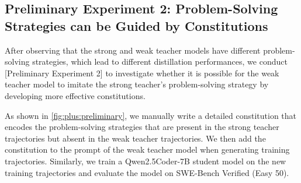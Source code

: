 \begin{table}[t]
\centering
\small
{}
\caption{Results on training Qwen2.5Coder-7B on successful trajectories of the exact same 399 function localization instances generated by Claude-3.7, Qwen2.5Coder-32B, and Qwen2.5Coder-32B with the constitutions we develop in the preliminary experiments (denoted as + \plusname-v0). 
We evaluate the student models on a subset of the SWE-bench Verified issue-solving dataset after training. 
}
\label{ablation:self-vs-claude}
\end{table}


\subsection{Preliminary Experiment 2: Problem-Solving Strategies can be Guided by Constitutions}
After observing that the strong and weak teacher models have different problem-solving strategies, which lead to different distillation performances, we conduct [Preliminary Experiment 2] to investigate whether it is possible for the weak teacher model to imitate the strong teacher's problem-solving strategy by developing more effective constitutions.

As shown in \autoref{fig:plus:preliminary}, we manually write a detailed constitution that encodes the problem-solving strategies that are present in the strong teacher trajectories but absent in the weak teacher trajectories.
We then add the constitution to the prompt of the weak teacher model when generating training trajectories.
Similarly, we train a Qwen2.5Coder-7B student model on the new training trajectories and evaluate the model on SWE-Bench Verified (Easy 50).

